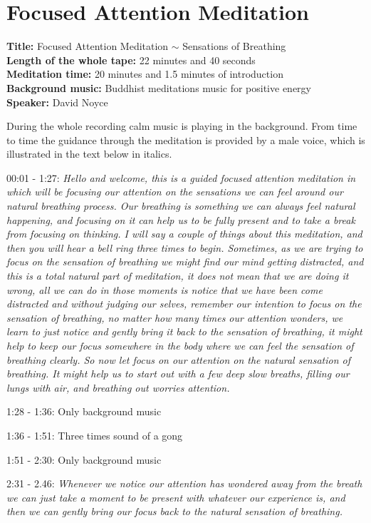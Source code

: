 \chapter{Focused Attention Meditation}
\textbf{Title:} Focused Attention Meditation $\sim$  Sensations of Breathing  \\
\textbf{Length of the whole tape:} 22 minutes and 40 seconds \\
\textbf{Meditation time:} 20 minutes and 1.5 minutes of introduction \\
\textbf{Background music:} Buddhist meditations music for positive energy  \\
\textbf{Speaker:} David Noyce 

During the whole recording calm music is playing in the background. From time to time the guidance through the meditation is provided by a male voice, which is illustrated in the text below in italics. 


00:01 - 1:27: \textit{Hello and welcome, this is a guided focused attention meditation in which will be focusing our attention on the sensations we can feel around our natural breathing process. Our breathing is something we can always feel natural happening, and focusing on it can help us to be fully present and to take a break from focusing on thinking. I will say a couple of things about this meditation, and then you will hear a bell ring three times to begin. Sometimes, as we are trying to focus on the sensation of breathing we might find our mind getting distracted, and this is a total natural part of meditation, it does not mean that we are doing it wrong, all we can do in those moments is notice that we have been come distracted and without judging our selves, remember our intention to focus on the sensation of breathing, no matter how many times our attention wonders, we learn to just notice and gently bring it back to the sensation of breathing, it might help to keep our focus somewhere in the body where we can feel the sensation of breathing clearly. So now let focus on our attention on the natural sensation of breathing. It might help us to start out with a few deep slow breaths, filling our lungs with air, and breathing out worries attention.}

1:28 - 1:36: Only background music 

1:36 - 1:51: Three times sound of a gong 

1:51 - 2:30: Only background music

2:31 - 2.46: \textit{Whenever we notice our attention has wondered away from the breath we can just take a moment to be present with whatever our experience is, and then we can gently bring our focus back to the natural sensation of breathing. }

